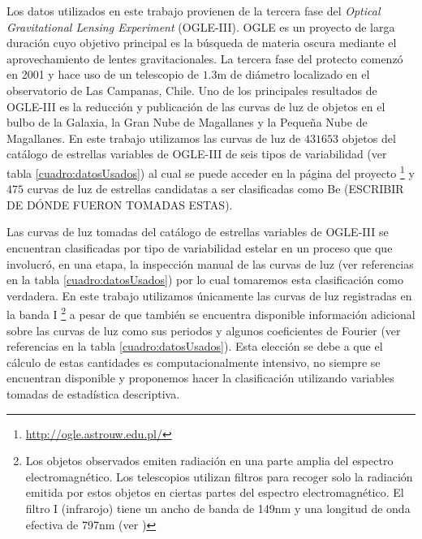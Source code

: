 \documentclass[letterpaper,12pt]{book}
\begin{document}
Los datos utilizados en este trabajo provienen de la tercera fase del \textit{Optical Gravitational Lensing Experiment} (OGLE-III). OGLE es un proyecto de larga duración cuyo objetivo principal es la búsqueda de materia oscura mediante el aprovechamiento de lentes gravitacionales. La tercera fase del protecto comenzó en 2001 y hace uso de un telescopio de $1.3$m de diámetro localizado en el observatorio de Las Campanas, Chile\cite{udalski_optical_2004}. Uno de los principales resultados de OGLE-III es la reducción y publicación \cite{udalski_optical_2008} de las curvas de luz de objetos en el bulbo de la Galaxia, la Gran Nube de Magallanes y la Pequeña Nube de Magallanes. En este trabajo utilizamos las curvas de luz de $431 653$ objetos del catálogo de estrellas variables de OGLE-III de seis tipos de variabilidad (ver tabla \ref{cuadro:datosUsados}) al cual se puede acceder en la página del proyecto \footnote{\url{http://ogle.astrouw.edu.pl/}} y $475$ curvas de luz de estrellas candidatas a ser clasificadas como Be (ESCRIBIR DE DÓNDE FUERON TOMADAS ESTAS).

Las curvas de luz tomadas del catálogo de estrellas variables de OGLE-III se encuentran clasificadas por tipo de variabilidad estelar en un proceso que que involucró, en una etapa, la inspección manual de las curvas de luz (ver referencias en la tabla \ref{cuadro:datosUsados}) por lo cual tomaremos esta clasificación como verdadera. En este trabajo utilizamos únicamente las curvas de luz registradas en la banda I \footnote{Los objetos observados emiten radiación en una parte amplia del espectro electromagnético. Los telescopios utilizan filtros para recoger solo la radiación emitida por estos objetos en ciertas partes del espectro electromagnético. El filtro I (infrarojo) tiene un ancho de banda de 149nm y una longitud de onda efectiva de 797nm (ver \cite{karttunen_fundamental_2007})} a pesar de que también se encuentra disponible información adicional sobre las curvas de luz como sus periodos y algunos coeficientes de Fourier (ver referencias en la tabla \ref{cuadro:datosUsados}). Esta elección se debe a que el cálculo de estas cantidades es computacionalmente intensivo, no siempre se encuentran disponible y proponemos hacer la clasificación utilizando variables tomadas de estadística descriptiva.
\end{document}
